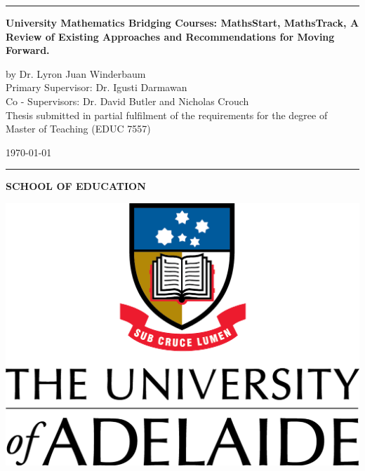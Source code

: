 \documentclass[twoside,12pt,a4paper]{report}
\begin{document}
\begin{titlepage}

\begin{flushleft}
\null
\vspace{2 cm}
\hrule
\vspace{1 cm}
{\huge{\bf University Mathematics Bridging Courses: MathsStart, MathsTrack, A Review of Existing Approaches and Recommendations for Moving Forward.}}
\vspace*{2cm}

\vspace{5.5 cm}
{\large by Dr. Lyron Juan Winderbaum}\\
\vspace{1 cm}
{\large Primary Supervisor: Dr. Igusti Darmawan}\\
\vspace{0.5 cm}
{\large Co - Supervisors: Dr. David Butler and Nicholas Crouch}\\
\vspace{2 cm}
{ Thesis submitted in partial fulfilment of the requirements for the degree of Master of Teaching (EDUC 7557)}\\
\vspace{0.5 cm}
\end{flushleft}

\begin{flushright}
{\monthyeardate\today }
\end{flushright}

\vspace{0.5 cm}
\hrule
\vspace{0.65cm}

\begin{flushleft}
\textbf{SCHOOL OF EDUCATION}
\end{flushleft}
\vspace{-1.5cm}
\begin{flushright}
\includegraphics[scale=0.75]{./files/UoA_logo_col_vert.png}
\end{flushright}
\vspace{-2 cm}

\end{titlepage}
\end{document}
